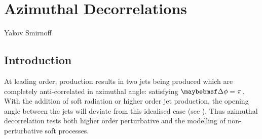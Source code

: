 \chapter{\Dijet Azimuthal Decorrelations}
\label{chap:azimuthal-decorrelation}

{Yakov Smirnoff}

\section{Introduction}
At leading order, \dijet production results in two jets being produced which are
completely anti-correlated in azimuthal angle: satisfying $\DeltaPhi = \pi$. With
the addition of soft radiation or higher order jet production, the opening angle
between the jets will deviate from this idealised case (see ).
Thus azimuthal decorrelation tests both higher order perturbative \QCD and the
modelling of non-perturbative soft processes.

